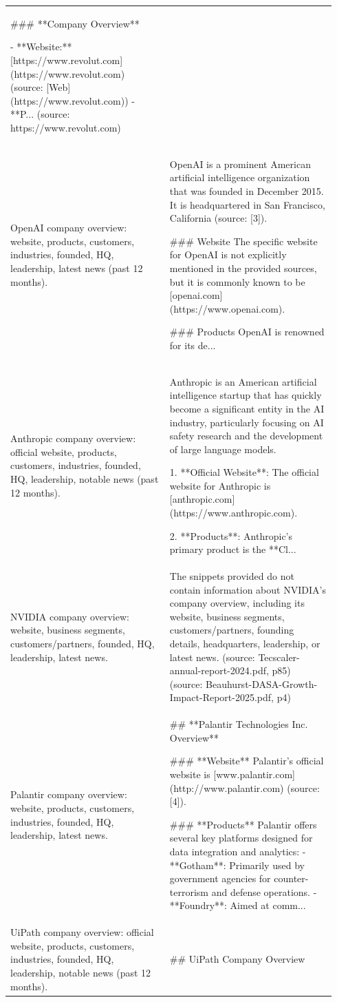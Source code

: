 \begin{longtable}{p{0.46\linewidth} p{0.48\linewidth}}
### **Company Overview**

- **Website:** [https://www.revolut.com](https://www.revolut.com) (source: [Web](https://www.revolut.com))
- **P... (source: https://www.revolut.com) \\
\addlinespace
OpenAI company overview: website, products, customers, industries, founded, HQ, leadership, latest news (past 12 months). & OpenAI is a prominent American artificial intelligence organization that was founded in December 2015. It is headquartered in San Francisco, California (source: [3]).

### Website
The specific website for OpenAI is not explicitly mentioned in the provided sources, but it is commonly known to be [openai.com](https://www.openai.com).

### Products
OpenAI is renowned for its de... \\
\addlinespace
Anthropic company overview: official website, products, customers, industries, founded, HQ, leadership, notable news (past 12 months). & Anthropic is an American artificial intelligence startup that has quickly become a significant entity in the AI industry, particularly focusing on AI safety research and the development of large language models.

1. **Official Website**: The official website for Anthropic is [anthropic.com](https://www.anthropic.com).

2. **Products**: Anthropic's primary product is the **Cl... \\
\addlinespace
NVIDIA company overview: website, business segments, customers/partners, founded, HQ, leadership, latest news. & The snippets provided do not contain information about NVIDIA's company overview, including its website, business segments, customers/partners, founding details, headquarters, leadership, or latest news. (source: Tecscaler-annual-report-2024.pdf, p85) (source: Beauhurst-DASA-Growth-Impact-Report-2025.pdf, p4) \\
\addlinespace
Palantir company overview: website, products, customers, industries, founded, HQ, leadership, latest news. & ## **Palantir Technologies Inc. Overview**

### **Website**
Palantir's official website is [www.palantir.com](http://www.palantir.com) (source: [4]).

### **Products**
Palantir offers several key platforms designed for data integration and analytics:
- **Gotham**: Primarily used by government agencies for counter-terrorism and defense operations.
- **Foundry**: Aimed at comm... \\
\addlinespace
UiPath company overview: official website, products, customers, industries, founded, HQ, leadership, notable news (past 12 months). & ## UiPath Company Overview


\end{longtable}
